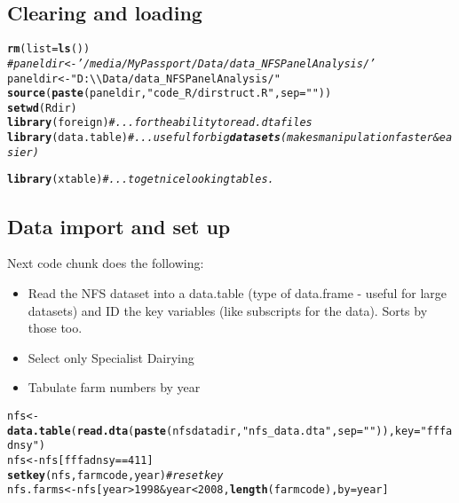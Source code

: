 \documentclass{article}\usepackage[]{graphicx}\usepackage[]{color}
\makeatletter
\newcommand{\hlstr}[1]{\textcolor[rgb]{0.192,0.494,0.8}{#1}}%
\newcommand{\hlcom}[1]{\textcolor[rgb]{0.678,0.584,0.686}{\textit{#1}}}%
\newcommand{\hlkwd}[1]{\textcolor[rgb]{0.737,0.353,0.396}{\textbf{#1}}}%
\newenvironment{kframe}{%
 \def\at@end@of@kframe{}%
 \ifinner\ifhmode%
  \def\at@end@of@kframe{\end{minipage}}%
  \begin{minipage}{\columnwidth}%
 \fi\fi%
 \def\FrameCommand##1{\hskip\@totalleftmargin \hskip-\fboxsep
 \colorbox{shadecolor}{##1}\hskip-\fboxsep
     \hskip-\linewidth \hskip-\@totalleftmargin \hskip\columnwidth}%
 \MakeFramed {\advance\hsize-\width
   \@totalleftmargin\z@ \linewidth\hsize
   \@setminipage}}%
 {\par\unskip\endMakeFramed%
 \at@end@of@kframe}
\newenvironment{knitrout}{}{} %
\makeatother
\begin{document}
\begin{flushleft}
\subsection*{Clearing and loading}
\begin{knitrout}
\color{fgcolor}\begin{kframe}
\begin{alltt}
\hlkwd{rm}(list = \hlkwd{ls}())
\hlcom{# paneldir <- '/media/MyPassport/Data/data_NFSPanelAnalysis/'}
paneldir <- \hlstr{"D:\textbackslash{}\textbackslash{}Data/data_NFSPanelAnalysis/"}
\hlkwd{source}(\hlkwd{paste}(paneldir, \hlstr{"code_R/dirstruct.R"}, sep = \hlstr{""}))
\hlkwd{setwd}(Rdir)
\hlkwd{library}(foreign)  \hlcom{#...for the ability to read .dta files}
\hlkwd{library}(data.table)  \hlcom{#... useful for big \hlkwd{datasets} (makes manipulation faster & easier)}
\end{alltt}


{\ttfamily\noindent\color{warningcolor}{\#\# Warning: package 'data.table' was built under R version 2.15.3}}

{\ttfamily\noindent\itshape{}}\begin{alltt}
\hlkwd{library}(xtable)  \hlcom{#... to get nice looking tables.}
\end{alltt}


{\ttfamily\noindent\color{warningcolor}{\#\# Warning: package 'xtable' was built under R version 2.15.3}}\end{kframe}
\end{knitrout}

 
\subsection*{Data import and set up}

Next code chunk does the following:
\begin{itemize}
  \item {Read the NFS dataset into a data.table (type of data.frame - useful for large datasets) and ID the key
        variables (like subscripts for the data). Sorts by those too.}
  \item {Select only Specialist Dairying}
  \item {Tabulate farm numbers by year}
\end{itemize}
\begin{knitrout}
\color{fgcolor}\begin{kframe}
\begin{alltt}
nfs <- \hlkwd{data.table}(\hlkwd{read.dta}(\hlkwd{paste}(nfsdatadir, \hlstr{"nfs_data.dta"}, sep = \hlstr{""})), key = \hlstr{"fffadnsy"})
nfs <- nfs[fffadnsy == 411]
\hlkwd{setkey}(nfs, farmcode, year)  \hlcom{# reset key}
nfs.farms <- nfs[year > 1998 & year < 2008, \hlkwd{length}(farmcode), by = year]
\end{alltt}
\end{kframe}
\end{knitrout}



\end{flushleft}
\end{document}
